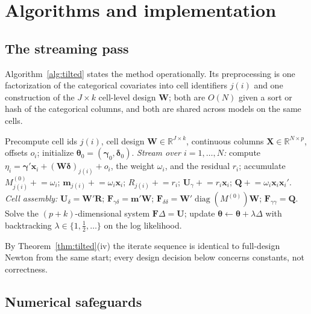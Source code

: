 \documentclass[11pt]{article}
\newcommand{\R}{\mathbb{R}}
\newcommand{\diag}{\operatorname{diag}}
\newcommand{\bgamma}{\bm{\gamma}}
\newcommand{\bdelta}{\bm{\delta}}
\newcommand{\btheta}{\bm{\theta}}
\newcommand{\bx}{\mathbf{x}}
\newcommand{\bQ}{\mathbf{Q}}
\newcommand{\bF}{\mathbf{F}}
\newcommand{\bU}{\mathbf{U}}
\newcommand{\bW}{\mathbf{W}}
\newcommand{\bX}{\mathbf{X}}
\begin{document}
\section{Algorithms and implementation}\label{sec:algorithms}

\subsection{The streaming pass}\label{sec:streaming}

Algorithm~\ref{alg:tilted} states the method operationally.  Its
preprocessing is one factorization of the categorical covariates into
cell identifiers $j(i)$ and one construction of the $J \times k$
cell-level design $\bW$; both are $O(N)$ given a sort or hash of the
categorical columns, and both are shared across models on the same
cells.

\begin{algorithm}[t]
\caption{Tilted-moment Newton / Fisher scoring}\label{alg:tilted}
\begin{algorithmic}[1]
\State Precompute cell ids $j(i)$, cell design $\bW \in \R^{J \times k}$,
  continuous columns $\bX \in \R^{N \times p}$, offsets $o_i$;
  initialize $\btheta_0 = (\bgamma_0, \bdelta_0)$.
\Repeat
  \State \emph{Stream over $i = 1, \dots, N$:} compute
    $\eta_i = \bgamma'\bx_i + (\bW\bdelta)_{j(i)} + o_i$, the weight
    $\omega_i$, and the residual $r_i$; accumulate
    $M^{(0)}_{j(i)} \mathrel{+}= \omega_i$;\;
    $\mathbf{m}_{j(i)} \mathrel{+}= \omega_i \bx_i$;\;
    $R_{j(i)} \mathrel{+}= r_i$;\;
    $\bU_\gamma \mathrel{+}= r_i \bx_i$;\;
    $\bQ \mathrel{+}= \omega_i \bx_i \bx_i'$.
  \State \emph{Cell assembly:} $\bU_\delta = \bW'\mathbf{R}$;\;
    $\bF_{\gamma\delta} = \mathbf{m}'\bW$;\;
    $\bF_{\delta\delta} = \bW'\diag(M^{(0)})\bW$;\;
    $\bF_{\gamma\gamma} = \bQ$.
  \State Solve the $(p{+}k)$-dimensional system
    $\bF \Delta = \bU$; update
    $\btheta \gets \btheta + \lambda \Delta$ with backtracking
    $\lambda \in \{1, \tfrac12, \dots\}$ on the log likelihood.
\end{algorithmic}
\end{algorithm}

By Theorem~\ref{thm:tilted}(iv) the iterate sequence is identical to
full-design Newton from the same start; every design decision below
concerns constants, not correctness.

\subsection{Numerical safeguards}\label{sec:stability}
\end{document}
